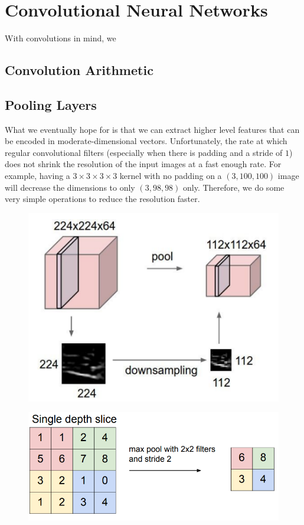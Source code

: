 \section{Convolutional Neural Networks}  

  With convolutions in mind, we 

\subsection{Convolution Arithmetic} 

\subsection{Pooling Layers}  

  What we eventually hope for is that we can extract higher level features that can be encoded in moderate-dimensional vectors. Unfortunately, the rate at which regular convolutional filters (especially when there is padding and a stride of $1$) does not shrink the resolution of the input images at a fast enough rate. For example, having a $3 \times 3 \times 3 \times 3$ kernel with no padding on a $(3, 100, 100)$ image will decrease the dimensions to only $(3, 98, 98)$ only. Therefore, we do some very simple operations to reduce the resolution faster. 

  \begin{figure}[H]
    \centering 
    \includegraphics[scale=0.4]{img/max_pool1.png}
    \caption{} 
    \label{fig:max_pool1}
  \end{figure}

  \begin{figure}[H]
    \centering 
    \includegraphics[scale=0.4]{img/max_pool2.png}
    \caption{} 
    \label{fig:max_pool2}
  \end{figure}

